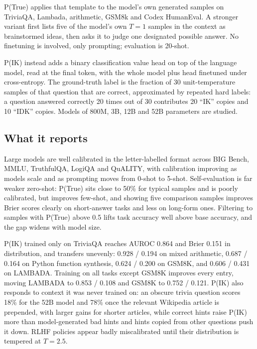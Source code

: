 P(True) applies that template to the model's own generated samples on TriviaQA, Lambada, arithmetic, GSM8k and Codex HumanEval. A stronger variant first lists five of the model's own $T=1$ samples in the context as brainstormed ideas, then asks it to judge one designated possible answer. No finetuning is involved, only prompting; evaluation is 20-shot.

P(IK) instead adds a binary classification value head on top of the language model, read at the final token, with the whole model plus head finetuned under cross-entropy. The ground-truth label is the fraction of 30 unit-temperature samples of that question that are correct, approximated by repeated hard labels: a question answered correctly 20 times out of 30 contributes 20 ``IK'' copies and 10 ``IDK'' copies. Models of 800M, 3B, 12B and 52B parameters are studied.

\subsection{What it reports}

Large models are well calibrated in the letter-labelled format across BIG Bench, MMLU, TruthfulQA, LogiQA and QuALITY, with calibration improving as models scale and as prompting moves from 0-shot to 5-shot. Self-evaluation is far weaker zero-shot: P(True) sits close to 50\% for typical samples and is poorly calibrated, but improves few-shot, and showing five comparison samples improves Brier scores clearly on short-answer tasks and less on long-form ones. Filtering to samples with P(True) above 0.5 lifts task accuracy well above base accuracy, and the gap widens with model size.

P(IK) trained only on TriviaQA reaches AUROC 0.864 and Brier 0.151 in distribution, and transfers unevenly: 0.928 / 0.194 on mixed arithmetic, 0.687 / 0.164 on Python function synthesis, 0.624 / 0.200 on GSM8K, and 0.606 / 0.431 on LAMBADA. Training on all tasks except GSM8K improves every entry, moving LAMBADA to 0.853 / 0.108 and GSM8K to 0.752 / 0.121. P(IK) also responds to context it was never trained on: an obscure trivia question scores 18\% for the 52B model and 78\% once the relevant Wikipedia article is prepended, with larger gains for shorter articles, while correct hints raise P(IK) more than model-generated bad hints and hints copied from other questions push it down. RLHF policies appear badly miscalibrated until their distribution is tempered at $T=2.5$.

